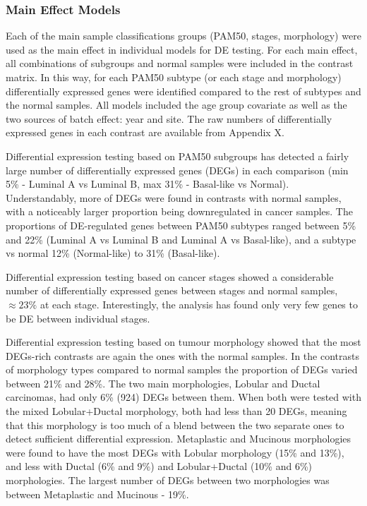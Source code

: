        \subsubsection{Main Effect Models}
        
        Each of the main sample classifications groups (PAM50, stages, morphology) were used as the main effect in individual models for DE testing. For each main effect, all combinations of subgroups and normal samples were included in the contrast matrix. In this way, for each PAM50 subtype (or each stage and morphology) differentially expressed genes were identified compared to the rest of subtypes and the normal samples. All models included the age group covariate as well as the two sources of batch effect: year and site. The raw numbers of differentially expressed genes in each contrast are available from Appendix X.

        Differential expression testing based on PAM50 subgroups has detected a fairly large number of differentially expressed genes (DEGs) in each comparison (min 5\% - Luminal A vs Luminal B, max 31\% - Basal-like vs Normal). Understandably, more of DEGs were found in contrasts with normal samples, with a noticeably larger proportion being downregulated in cancer samples. The proportions of DE-regulated genes between PAM50 subtypes ranged between 5\% and 22\% (Luminal A vs Luminal B and Luminal A vs Basal-like), and a subtype vs normal 12\% (Normal-like) to 31\% (Basal-like). 
        
        Differential expression testing based on cancer stages showed a considerable number of differentially expressed genes between stages and normal samples, $\approx 23\%$ at each stage. Interestingly, the analysis has found only very few genes to be DE between individual stages.
        
        Differential expression testing based on tumour morphology showed that the most DEGs-rich contrasts are again the ones with the normal samples. In the contrasts of morphology types compared to normal samples the proportion of DEGs varied between 21\% and 28\%. The two main morphologies, Lobular and Ductal carcinomas,  had only 6\% (924) DEGs between them. When both were tested with the mixed Lobular+Ductal morphology, both had less than 20 DEGs, meaning that this morphology is too much of a blend between the two separate ones to detect sufficient differential expression. Metaplastic and Mucinous morphologies were found to have the most DEGs with Lobular morphology (15\% and 13\%), and less with Ductal (6\% and 9\%) and Lobular+Ductal (10\% and 6\%) morphologies. The largest number of DEGs between two morphologies was between Metaplastic and Mucinous - 19\%. 
        
